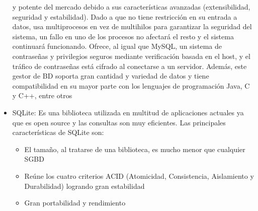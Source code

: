 \begin{itemize}
    y potente del mercado debido a sus características avanzadas (extensibilidad, seguridad y
    estabilidad). Dado a que no tiene restricción en su entrada a datos, usa multiprocesos en vez
    de multihilos para garantizar la seguridad del sistema, un fallo en uno de los procesos no
    afectará el resto y el sistema continuará funcionando. Ofrece, al igual que MySQL, un sistema
    de contraseñas y privilegios seguros mediante verificación basada en el host, y el tráfico de
    contraseñas está cifrado al conectarse a un servidor. Además, este gestor de BD soporta gran
    cantidad y variedad de datos y tiene compatibilidad en su mayor parte con los lenguajes de
    programación Java, C y C++, entre otros
    \item SQLite: Es una biblioteca utilizada en multitud de aplicaciones actuales ya que es open 
    source y las consultas son muy eficientes. Las principales características de SQLite son:
    \begin{itemize}
        \item El tamaño, al tratarse de una biblioteca, es mucho menor que cualquier SGBD
        \item Reúne los cuatro criterios ACID (Atomicidad, Consistencia, Aislamiento y Durabilidad) logrando gran estabilidad
        \item Gran portabilidad y rendimiento
    \end{itemize}
\end{itemize}